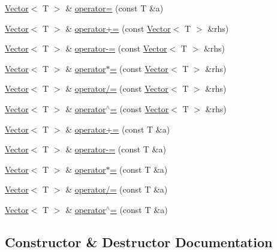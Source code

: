 \begin{DoxyCompactItemize}
\item 
\mbox{\hyperlink{classVector}{Vector}}$<$ T $>$ \& \mbox{\hyperlink{classVector_a6bbf5f187006ef2567fdcebd37ebfa97}{operator=}} (const T \&a)
\item 
\mbox{\hyperlink{classVector}{Vector}}$<$ T $>$ \& \mbox{\hyperlink{classVector_a0cdad8a65e9dd1ef60afaf32aa547f9e}{operator+=}} (const \mbox{\hyperlink{classVector}{Vector}}$<$ T $>$ \&rhs)
\item 
\mbox{\hyperlink{classVector}{Vector}}$<$ T $>$ \& \mbox{\hyperlink{classVector_ab5ed11e19503bbc0ee10c7a8d1ee2978}{operator-\/=}} (const \mbox{\hyperlink{classVector}{Vector}}$<$ T $>$ \&rhs)
\item 
\mbox{\hyperlink{classVector}{Vector}}$<$ T $>$ \& \mbox{\hyperlink{classVector_a3b3e94a4ee6601a8c3ceaed790c2d965}{operator$\ast$=}} (const \mbox{\hyperlink{classVector}{Vector}}$<$ T $>$ \&rhs)
\item 
\mbox{\hyperlink{classVector}{Vector}}$<$ T $>$ \& \mbox{\hyperlink{classVector_adbf519ce5d68eb131947137e30596dc1}{operator/=}} (const \mbox{\hyperlink{classVector}{Vector}}$<$ T $>$ \&rhs)
\item 
\mbox{\hyperlink{classVector}{Vector}}$<$ T $>$ \& \mbox{\hyperlink{classVector_acd4d558272832a19d614468400ca605d}{operator$^\wedge$=}} (const \mbox{\hyperlink{classVector}{Vector}}$<$ T $>$ \&rhs)
\item 
\mbox{\hyperlink{classVector}{Vector}}$<$ T $>$ \& \mbox{\hyperlink{classVector_a5650df0775f0677f76259cd3f474dded}{operator+=}} (const T \&a)
\item 
\mbox{\hyperlink{classVector}{Vector}}$<$ T $>$ \& \mbox{\hyperlink{classVector_a7581aba7a67b45ff1b2848d37e00cfa1}{operator-\/=}} (const T \&a)
\item 
\mbox{\hyperlink{classVector}{Vector}}$<$ T $>$ \& \mbox{\hyperlink{classVector_a02e9c5296c7ddb1a2047a8c80d93e0d5}{operator$\ast$=}} (const T \&a)
\item 
\mbox{\hyperlink{classVector}{Vector}}$<$ T $>$ \& \mbox{\hyperlink{classVector_a358eca4649d02b3bbab359484eb93140}{operator/=}} (const T \&a)
\item 
\mbox{\hyperlink{classVector}{Vector}}$<$ T $>$ \& \mbox{\hyperlink{classVector_a6767000b5cbf4999aa301eb24a7b74fc}{operator$^\wedge$=}} (const T \&a)
\end{DoxyCompactItemize}


\subsection{Constructor \& Destructor Documentation}
\mbox{\label{classVector_a39d6069675db4ecfc1ab81d440da759a}} 
